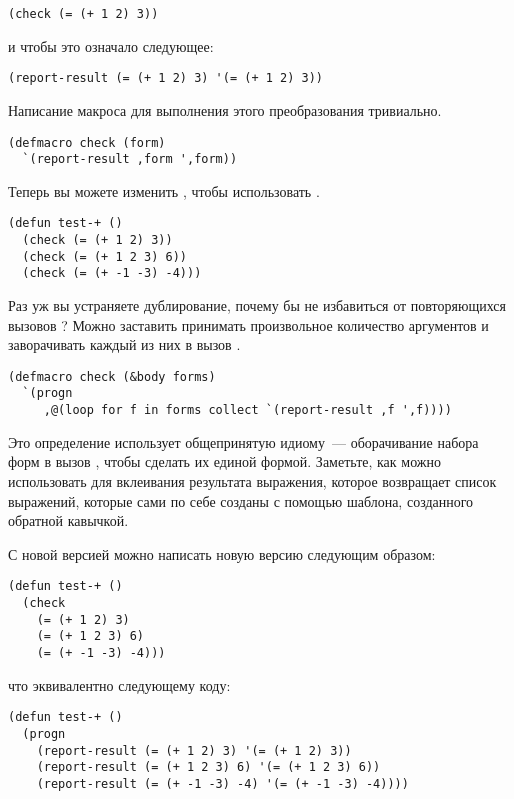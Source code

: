 \begin{lstlisting}
(check (= (+ 1 2) 3))
\end{lstlisting}

и чтобы это означало следующее:

\begin{lstlisting}
(report-result (= (+ 1 2) 3) '(= (+ 1 2) 3))
\end{lstlisting}

Написание макроса для выполнения этого преобразования тривиально.

\begin{lstlisting}
(defmacro check (form)
  `(report-result ,form ',form))
\end{lstlisting}

Теперь вы можете изменить , чтобы использовать .

\begin{lstlisting}
(defun test-+ ()
  (check (= (+ 1 2) 3))
  (check (= (+ 1 2 3) 6))
  (check (= (+ -1 -3) -4)))
\end{lstlisting}

Раз уж вы устраняете дублирование, почему бы не избавиться от повторяющихся вызовов
? Можно заставить  принимать произвольное количество аргументов и
заворачивать каждый из них в вызов .

\begin{lstlisting}
(defmacro check (&body forms)
  `(progn
     ,@(loop for f in forms collect `(report-result ,f ',f))))
\end{lstlisting}

Это определение использует общепринятую идиому~--- оборачивание набора форм в вызов
, чтобы сделать их единой формой. Заметьте, как можно использовать 
для вклеивания результата выражения, которое возвращает список выражений, которые сами по
себе созданы с помощью шаблона, созданного обратной кавычкой.

С новой версией  можно написать новую версию  следующим образом:

\begin{lstlisting}
(defun test-+ ()
  (check
    (= (+ 1 2) 3)
    (= (+ 1 2 3) 6)
    (= (+ -1 -3) -4)))
\end{lstlisting}

что эквивалентно следующему коду:

\begin{lstlisting}
(defun test-+ ()
  (progn
    (report-result (= (+ 1 2) 3) '(= (+ 1 2) 3))
    (report-result (= (+ 1 2 3) 6) '(= (+ 1 2 3) 6))
    (report-result (= (+ -1 -3) -4) '(= (+ -1 -3) -4))))
\end{lstlisting}


